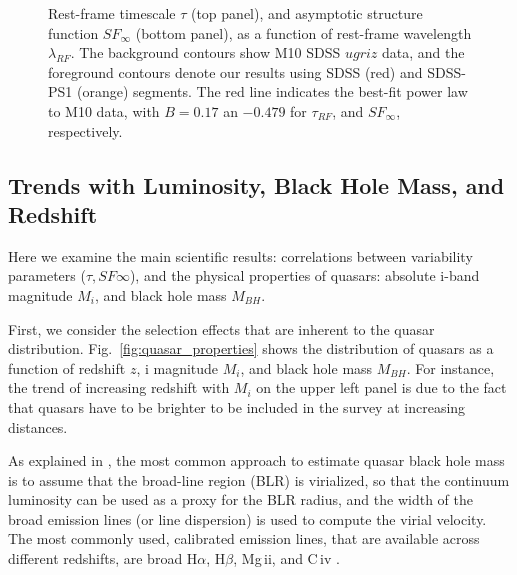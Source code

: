 \documentclass[twocolumn]{aastex62}
\begin{document}
  
\begin{figure*}
\caption{Rest-frame timescale $\tau$ (top panel), and asymptotic structure function $SF_{\infty}$ (bottom panel), as a function of rest-frame wavelength $\lambda_{RF}$. The background contours show M10 SDSS $ugriz$ data, and the foreground contours  denote our results using  SDSS (red) and SDSS-PS1 (orange) segments. The red line indicates the best-fit power law to M10 data, with $B=0.17$ an $-0.479$ for $\tau_{RF}$, and $SF_{\infty}$, respectively.}
\label{fig:wavelength_dependence}
\end{figure*} 


\subsection{Trends with Luminosity, Black Hole Mass, and Redshift}

Here we examine the main scientific results: correlations between variability parameters  ($\tau, SF{\infty}$), and the physical properties of quasars: absolute i-band magnitude $M_{i}$, and black hole mass $M_{BH}$. 

First, we consider the selection effects that are inherent to the quasar distribution. Fig.~\ref{fig:quasar_properties} shows the distribution of quasars as a function of redshift $z$, i magnitude $M_{i}$, and black hole mass $M_{BH}$. For instance, the trend of increasing redshift with $M_{i}$ on the upper left panel is due to the fact that quasars have to be brighter to be included in the survey at increasing distances. 



As explained in \citep{shen2008,shen2011}, the most common approach to estimate quasar black hole mass is to assume that the broad-line region (BLR) is virialized, so that the continuum luminosity can be used as a proxy for the BLR radius, and the width of the broad emission lines (or line dispersion) is used to compute the virial velocity. The most commonly used, calibrated emission lines, that are available across different redshifts, are broad H$\alpha$, H$\beta$, Mg\,{\sc ii}, and C\,{\sc iv} \citep{vestergaard2002}. 
\end{document}

